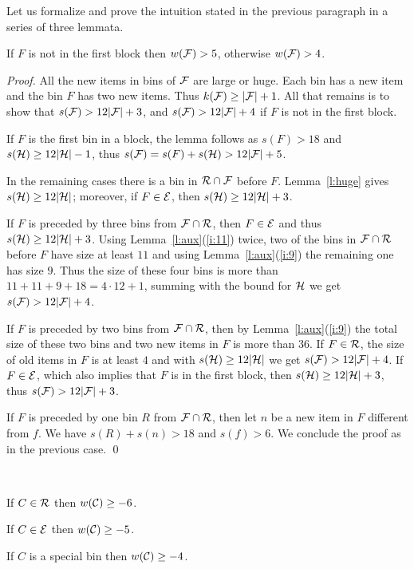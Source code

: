 Let us formalize and prove the intuition stated in the previous
paragraph in a series of three lemmata.

\begin{lem}
\label{l:f} 
If $F$ is not in the first block then $w({\mathcal F})>5$, otherwise $w({\mathcal F})>4$.
\end{lem}
\begin{proof}
All the new items in bins of ${\mathcal F}$ are large or huge. Each bin has a
new item and the bin $F$ has two new items. Thus $k({\mathcal F})\geq
|{\mathcal F}|+1$. All that remains is to show that $s({\mathcal F})>12|{\mathcal F}|+3$,
and $s({\mathcal F})>12|{\mathcal F}|+4$ if $F$ is not in the first block.

If $F$ is the first bin in a block, the lemma follows as $s(F)>18$ and
$s({\mathcal H})\geq12|{\mathcal H}|-1$, thus $s({\mathcal F})=s(F)+s({\mathcal H})>12|{\mathcal F}|+5$.

In the remaining cases there is a bin in ${\mathcal R}\cap{\mathcal F}$ before $F$.
Lemma~\ref{l:huge} gives $s({\mathcal H})\geq12|{\mathcal H}|$; moreover, if
$F\in{\mathcal E}$, then $s({\mathcal H})\geq12|{\mathcal H}|+3$.

If $F$ is preceded by three bins from ${\mathcal F}\cap{\mathcal R}$, then
$F\in{\mathcal E}$ and thus $s({\mathcal H})\geq12|{\mathcal H}|+3$. Using
Lemma~\ref{l:aux}(\ref{i:11}) twice, two of the bins in
${\mathcal F}\cap{\mathcal R}$ before $F$
have size at least $11$ and using Lemma~\ref{l:aux}(\ref{i:9}) the
remaining one has size $9$. Thus the size of these four bins is more
than $11+11+9+18=4\cdot12+1$, summing with the bound for ${\mathcal H}$ we get
$s({\mathcal F})>12|{\mathcal F}|+4$. 

If $F$ is preceded by two bins from ${\mathcal F}\cap{\mathcal R}$, then by
Lemma~\ref{l:aux}(\ref{i:9}) the total size of these two bins and two
new items in $F$ is more than $36$. If $F\in{\mathcal R}$, the size of old
items in $F$ is at least $4$ and with $s({\mathcal H})\geq12|{\mathcal H}|$ we get
$s({\mathcal F})>12|{\mathcal F}|+4$. 
If $F\in{\mathcal E}$, which also implies that $F$ is in the first block, then
$s({\mathcal H})\geq12|{\mathcal H}|+3$, thus $s({\mathcal F})>12|{\mathcal F}|+3$. 

If $F$ is preceded by one bin $R$ from ${\mathcal F}\cap{\mathcal R}$, then let $n$ be a
new item in $F$ different from $f$. We have $s(R)+s(n)>18$ and
$s(f)>6$. We conclude the proof as in the previous case.
\qed
\end{proof}

\begin{lem}
\label{l:c} ~

If $C\in{\mathcal R}$ then $w({\mathcal C})\geq -6$. 

If $C\in{\mathcal E}$ then $w({\mathcal C})\geq -5$. 

If $C$ is a special bin then $w({\mathcal C})\geq -4$.
\end{lem}


